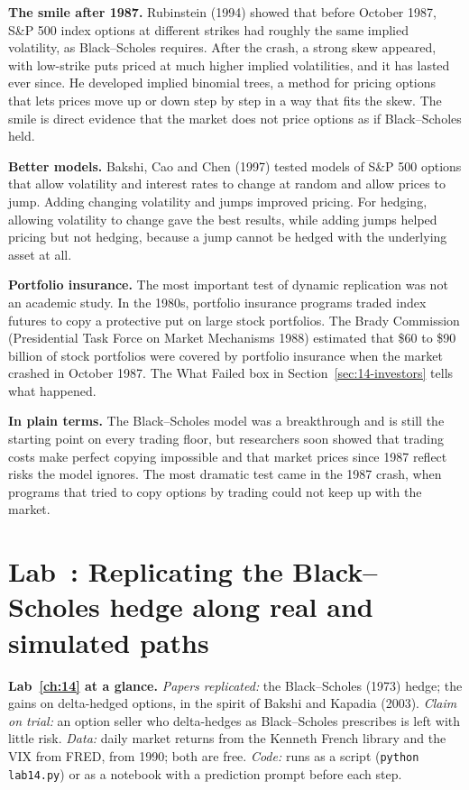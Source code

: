 \textbf{The smile after 1987.} Rubinstein (1994) showed that before October 1987, S\&P 500 index options at different strikes had roughly the same implied volatility, as Black--Scholes requires. After the crash, a strong skew appeared, with low-strike puts priced at much higher implied volatilities, and it has lasted ever since. He developed implied binomial trees, a method for pricing options that lets prices move up or down step by step in a way that fits the skew. The smile is direct evidence that the market does not price options as if Black--Scholes held.

\textbf{Better models.} Bakshi, Cao and Chen (1997) tested models of S\&P 500 options that allow volatility and interest rates to change at random and allow prices to jump. Adding changing volatility and jumps improved pricing. For hedging, allowing volatility to change gave the best results, while adding jumps helped pricing but not hedging, because a jump cannot be hedged with the underlying asset at all.

\textbf{Portfolio insurance.} The most important test of dynamic replication was not an academic study. In the 1980s, portfolio insurance programs traded index futures to copy a protective put on large stock portfolios. The Brady Commission (Presidential Task Force on Market Mechanisms 1988) estimated that \$60 to \$90 billion of stock portfolios were covered by portfolio insurance when the market crashed in October 1987. The What Failed box in Section~\ref{sec:14-investors} tells what happened.

\noindent\textbf{In plain terms.} The Black--Scholes model was a breakthrough and is still the starting point on every trading floor, but researchers soon showed that trading costs make perfect copying impossible and that market prices since 1987 reflect risks the model ignores. The most dramatic test came in the 1987 crash, when programs that tried to copy options by trading could not keep up with the market.

\section{Lab~\thechapter: Replicating the Black--Scholes hedge along real and simulated paths}
\label{sec:14-lab}

\begin{callout}
\textbf{Lab~\ref{ch:14} at a glance.} \emph{Papers replicated:} the Black--Scholes (1973) hedge; the gains on delta-hedged options, in the spirit of Bakshi and Kapadia (2003). \emph{Claim on trial:} an option seller who delta-hedges as Black--Scholes prescribes is left with little risk. \emph{Data:} daily market returns from the Kenneth French library and the VIX from FRED, from 1990; both are free. \emph{Code:} runs as a script (\texttt{python lab14.py}) or as a notebook with a prediction prompt before each step.
\end{callout}

